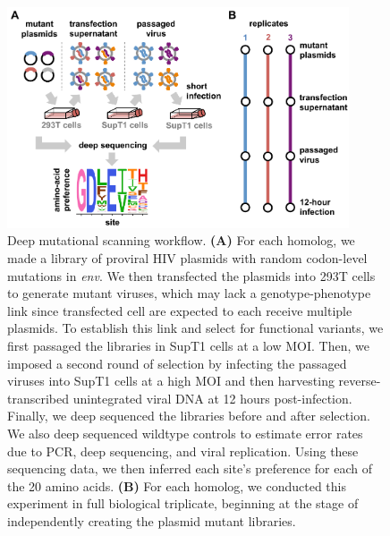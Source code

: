 \documentclass[9pt,lineno]{elife}
\begin{document}
\begin{figure}
\centerline{\includegraphics[width=0.9\textwidth]{figures/dms_schematic/dms_schematic.pdf}}
\caption{\label{fig:dms_schematic}
Deep mutational scanning workflow.
{\bf (A)} For each homolog, we made a library of proviral HIV plasmids with random codon-level mutations in \textit{env}.
We then transfected the plasmids into 293T cells to generate mutant viruses, which may lack a genotype-phenotype link since transfected cell are expected to each receive multiple plasmids.
To establish this link and select for functional variants, we first passaged the libraries in SupT1 cells at a low MOI.
Then, we imposed a second round of selection by infecting the passaged viruses into SupT1 cells at a high MOI and then harvesting reverse-transcribed unintegrated viral DNA at 12 hours post-infection.
Finally, we deep sequenced the libraries before and after selection.
We also deep sequenced wildtype controls to estimate error rates due to PCR, deep sequencing, and viral replication.
Using these sequencing data, we then inferred each site's preference for each of the 20 amino acids.
{\bf (B)} For each homolog, we conducted this experiment in full biological triplicate, beginning at the stage of independently creating the plasmid mutant libraries.
}
\end{figure}
\end{document}
